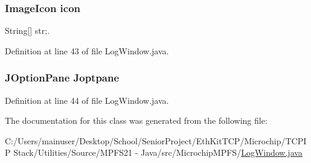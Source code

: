\subsubsection[{icon}]{\setlength{\rightskip}{0pt plus 5cm}Image\+Icon icon}\label{class_microchip_m_p_f_s_1_1_log_window_a12902116051c1f10f030e7e7416cf53c}


String\mbox{[}\mbox{]} str;. 



Definition at line 43 of file Log\+Window.\+java.

\hypertarget{class_microchip_m_p_f_s_1_1_log_window_a992fd16807c54cc8a48654acbf898b55}{}
\subsubsection[{Joptpane}]{\setlength{\rightskip}{0pt plus 5cm}J\+Option\+Pane Joptpane}\label{class_microchip_m_p_f_s_1_1_log_window_a992fd16807c54cc8a48654acbf898b55}


Definition at line 44 of file Log\+Window.\+java.



The documentation for this class was generated from the following file\+:\begin{DoxyCompactItemize}
\item 
C\+:/\+Users/mainuser/\+Desktop/\+School/\+Senior\+Project/\+Eth\+Kit\+T\+C\+P/\+Microchip/\+T\+C\+P\+I\+P Stack/\+Utilities/\+Source/\+M\+P\+F\+S21 -\/ Java/src/\+Microchip\+M\+P\+F\+S/\hyperlink{_log_window_8java}{Log\+Window.\+java}\end{DoxyCompactItemize}
